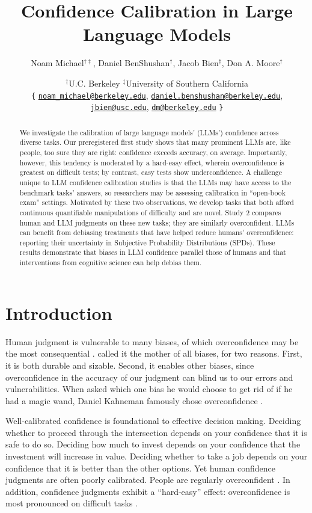 \documentclass{article}
\title{Confidence Calibration in Large Language Models}
\author{
  Noam Michael$^{\dagger\ddagger}$,\;
  Daniel BenShushan$^{\dagger}$,\;
  Jacob Bien$^{\ddagger}$,\;
  Don A. Moore$^{\dagger}$
}
\date{
  $^{\dagger}$U.C. Berkeley \quad $^{\ddagger}$University of Southern California \\[0.3em]
  {\small
  \texttt{\{}
  \href{mailto:noam_michael@berkeley.edu}{\texttt{noam\_michael@berkeley.edu}},\;
  \href{mailto:daniel.benshushan@berkeley.edu}{\texttt{daniel.benshushan@berkeley.edu}},\;
  \href{mailto:jbien@usc.edu}{\texttt{jbien@usc.edu}},\;
  \href{mailto:dm@berkeley.edu}{\texttt{dm@berkeley.edu}}
  \texttt{\}}
  }
}
\begin{document}
\maketitle

\begin{abstract}
We investigate the calibration of large language models' (LLMs') confidence across diverse tasks. Our preregistered first study shows that many prominent LLMs are, like people, too sure they are right: confidence exceeds accuracy, on average. Importantly, however, this tendency is moderated by a hard-easy effect, wherein overconfidence is greatest on difficult tests; by contrast, easy tests show underconfidence. A challenge unique to LLM confidence calibration studies is that the LLMs may have access to the benchmark tasks' answers, so researchers may be assessing calibration in ``open-book exam'' settings.  Motivated by these two observations, we develop tasks that both afford continuous quantifiable manipulations of difficulty and are novel. Study 2 compares human and LLM judgments on these new tasks; they are similarly overconfident. LLMs can benefit from debiasing treatments that have helped reduce humans' overconfidence: reporting their uncertainty in Subjective Probability Distributions (SPDs). These results demonstrate that biases in LLM confidence parallel those of humans and that interventions from cognitive science can help debias them.
\end{abstract}




\section{Introduction}
Human judgment is vulnerable to many biases, of which overconfidence may be the most consequential \citep{Kahneman_2011}. \citet{Bazerman_Moore_2013} called it the mother of all biases, for two reasons. First, it is both durable and sizable. Second, it enables other biases, since overconfidence in the accuracy of our judgment can blind us to our errors and vulnerabilities. When asked which one bias he would choose to get rid of if he had a magic wand, Daniel Kahneman famously chose overconfidence \citep{Shariatmadari_2015}. 

Well-calibrated confidence is foundational to effective decision making. Deciding whether to proceed through the intersection depends on your confidence that it is safe to do so. Deciding how much to invest depends on your confidence that the investment will increase in value. Deciding whether to take a job depends on your confidence that it is better than the other options. Yet human confidence judgments are often poorly calibrated. People are regularly overconfident \citep{Harvey_1997}. In addition, confidence judgments exhibit a ``hard-easy'' effect: overconfidence is most pronounced on difficult tasks \citep{Lichtenstein_Fischhoff_1977}.
\end{document}
